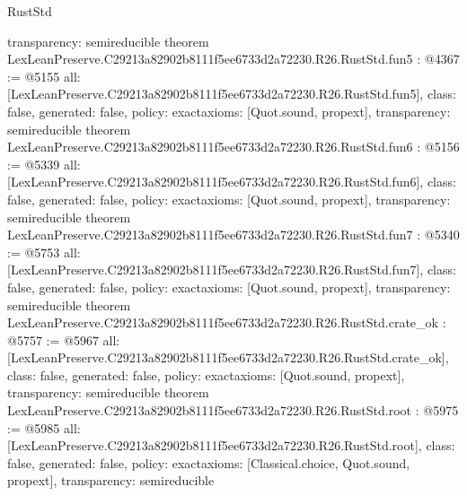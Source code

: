 \begin{lexlean}{RustStd}
\begin{coremodule}
{  transparency: semireducible
}
theorem LexLeanPreserve.C29213a82902b8111f5ee6733d2a72230.R26.RustStd.fun5 : @4367 := @5155 {
  all: [LexLeanPreserve.C29213a82902b8111f5ee6733d2a72230.R26.RustStd.fun5],
  class: false,
  generated: false,
  policy: exact{axioms: [Quot.sound, propext]},
  transparency: semireducible
}
theorem LexLeanPreserve.C29213a82902b8111f5ee6733d2a72230.R26.RustStd.fun6 : @5156 := @5339 {
  all: [LexLeanPreserve.C29213a82902b8111f5ee6733d2a72230.R26.RustStd.fun6],
  class: false,
  generated: false,
  policy: exact{axioms: [Quot.sound, propext]},
  transparency: semireducible
}
theorem LexLeanPreserve.C29213a82902b8111f5ee6733d2a72230.R26.RustStd.fun7 : @5340 := @5753 {
  all: [LexLeanPreserve.C29213a82902b8111f5ee6733d2a72230.R26.RustStd.fun7],
  class: false,
  generated: false,
  policy: exact{axioms: [Quot.sound, propext]},
  transparency: semireducible
}
theorem LexLeanPreserve.C29213a82902b8111f5ee6733d2a72230.R26.RustStd.crate_ok : @5757 := @5967 {
  all: [LexLeanPreserve.C29213a82902b8111f5ee6733d2a72230.R26.RustStd.crate_ok],
  class: false,
  generated: false,
  policy: exact{axioms: [Quot.sound, propext]},
  transparency: semireducible
}
theorem LexLeanPreserve.C29213a82902b8111f5ee6733d2a72230.R26.RustStd.root : @5975 := @5985 {
  all: [LexLeanPreserve.C29213a82902b8111f5ee6733d2a72230.R26.RustStd.root],
  class: false,
  generated: false,
  policy: exact{axioms: [Classical.choice, Quot.sound, propext]},
  transparency: semireducible
}


\end{coremodule}
\end{lexlean}
